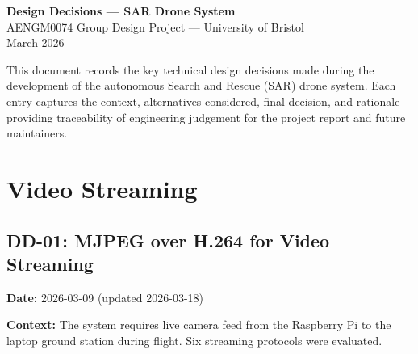 \documentclass[10pt,a4paper]{article}
\newcommand{\ddlabel}[1]{\textbf{\color{headblue}#1}\hspace{0.5em}}
\begin{document}
\begin{center}
  {\LARGE\bfseries Design Decisions --- SAR Drone System}\\[10pt]
  {\large AENGM0074 Group Design Project --- University of Bristol}\\[4pt]
  {\normalsize March 2026}
\end{center}

\vspace{4pt}

\begin{abstractbox}
This document records the key technical design decisions made during the development of the autonomous Search and Rescue (SAR) drone system. Each entry captures the context, alternatives considered, final decision, and rationale---providing traceability of engineering judgement for the project report and future maintainers.
\end{abstractbox}

\vspace{6pt}

\tableofcontents

\vspace{8pt}

\section{Video Streaming}

\subsection{DD-01: MJPEG over H.264 for Video Streaming}
\label{sec:dd01}

\ddlabel{Date:} 2026-03-09 (updated 2026-03-18)

\ddlabel{Context:} The system requires live camera feed from the Raspberry Pi to the laptop ground station during flight. Six streaming protocols were evaluated.

\vspace{4pt}
\end{document}
